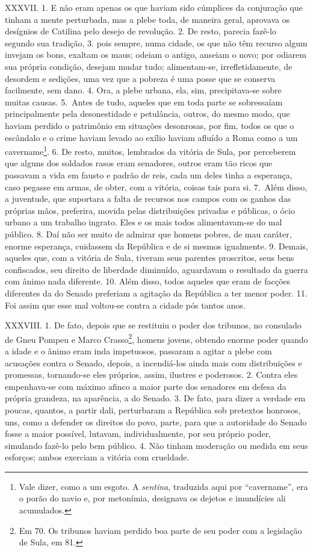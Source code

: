 XXXVII. 1. E não eram apenas os que haviam sido cúmplices da conjuração que
tinham a mente perturbada, mas a plebe toda, de maneira geral, aprovava os
desígnios de Catilina pelo desejo de revolução. 2. De resto, parecia fazê-lo
segundo sua tradição, 3. pois sempre, numa cidade, os que não têm recurso algum
invejam os bons, exaltam os maus; odeiam o antigo, anseiam o novo; por
odiarem sua própria condição, desejam mudar tudo; alimentam-se, irrefletidamente,
de desordem e sedições, uma vez que a pobreza é uma posse que se conserva
facilmente, sem dano. 4. Ora, a plebe urbana, ela, sim, precipitava-se sobre
muitas causas. 5.~Antes de tudo, aqueles que em toda parte se sobressaíam
principalmente pela desonestidade e petulância, outros, do mesmo modo, que
haviam perdido o patrimônio em situações desonrosas, por fim, todos os que o
escândalo e o crime haviam levado ao exílio haviam afluído a Roma como a um
cavername\footnote{Vale dizer, como a um esgoto. A \emph{sentina}, traduzida
aqui por ``cavername'', era o porão do navio e, por metonímia, designava os
dejetos e imundícies ali acumulados.}. 6. De resto, muitos, lembrados da
vitória de Sula, por perceberem que alguns dos soldados rasos eram senadores,
outros eram tão ricos que passavam a vida em fausto e padrão de reis, cada um
deles tinha a esperança, caso pegasse em armas, de obter, com a vitória, coisas
tais para si. 7.~Além disso, a juventude, que suportara a falta de recursos nos
campos com os ganhos das próprias mãos, preferira, movida pelas distribuições
privadas e públicas, o ócio urbano a um trabalho ingrato. Eles e os mais todos
alimentavam-se do mal público. 8. Daí não ser muito de admirar que homens
pobres, de mau caráter, enorme esperança, cuidassem da República e de si mesmos
igualmente. 9. Demais, aqueles que, com a vitória de Sula, tiveram seus
parentes proscritos, seus bens confiscados, seu direito de liberdade diminuído,
aguardavam o resultado da guerra com ânimo nada diferente. 10. Além disso,
todos aqueles que eram de facções diferentes da do Senado preferiam a agitação
da República a ter menor poder. 11. Foi assim que esse mal voltou-se contra a
cidade pós tantos anos.

XXXVIII. 1. De fato, depois que se restituiu o poder dos tribunos, no consulado
de Gneu Pompeu e Marco Crasso\footnote{Em 70. Os tribunos haviam perdido boa
parte de seu poder com a legislação de Sula, em 81.}, homens jovens, obtendo
enorme poder quando a idade e o ânimo eram inda impetuosos, passaram a agitar a
plebe com acusações contra o Senado, depois, a incendiá-los ainda mais com
distribuições e promessas, tornando-se eles próprios, assim, ilustres e
poderosos. 2. Contra eles empenhava-se com máximo afinco a maior parte dos
senadores em defesa da própria grandeza, na aparência, a do Senado. 3. De fato,
para dizer a verdade em poucas, quantos, a partir dali, perturbaram a República
sob pretextos honrosos, uns, como a defender os direitos do povo, parte, para
que a autoridade do Senado fosse a maior possível, lutavam, individualmente, por seu
próprio poder, simulando fazê-lo pelo bem público. 4. Não tinham moderação ou medida em
seus esforços; ambos exerciam a vitória com crueldade. 

